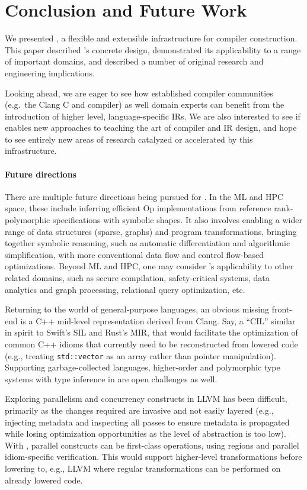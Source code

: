 \section{Conclusion and Future Work}

We presented \MLIR, a flexible and extensible infrastructure for compiler
construction. This paper described \MLIR's concrete
design, demonstrated its applicability to a range of
important domains, and described a number of original research and engineering
implications.

Looking ahead, we are eager to see how established compiler communities
(e.g.\ the Clang C and \Cpp compiler) as well domain experts can benefit from the
introduction of higher level, language-specific IRs. We are also interested to
see if \MLIR enables new approaches to teaching the art of compiler and IR
design, and hope to see entirely new areas of research catalyzed or accelerated
by this infrastructure.

\paragraph{Future directions}

There are multiple future directions being pursued for \MLIR.
In the ML and HPC space, these include inferring efficient Op implementations from reference rank-polymorphic specifications with symbolic shapes. It also involves enabling a wider range of data structures (sparse, graphs) and program transformations, bringing together symbolic reasoning, such as automatic differentiation and algorithmic simplification, with more conventional data flow and control flow-based optimizations. Beyond ML and HPC, one may consider \MLIR's applicability to other related domains, such as secure compilation, safety-critical systems, data analytics and graph processing, relational query optimization, etc.

Returning to the world of general-purpose languages, an obvious missing front-end
is a C++ mid-level
representation derived from Clang. Say, a ``CIL'' similar in spirit to Swift's SIL and Rust's MIR, that would facilitate the optimization of
common C++ idioms that currently need to be reconstructed from lowered code (e.g.,
treating \lstinline{std::vector} as an array rather than pointer manipulation). Supporting garbage-collected languages, higher-order and polymorphic type systems with type inference in \MLIR are open challenges as well.

Exploring parallelism and concurrency constructs in LLVM has been difficult,
primarily as the changes required are invasive and not easily layered (e.g.,
injecting metadata and inspecting all passes to ensure metadata is propagated
while losing optimization opportunities as the level of abstraction is too low).
With \MLIR, parallel constructs
can be first-class operations, using regions and parallel idiom-specific verification. This would support
higher-level transformations before lowering to, e.g., LLVM where regular
transformations can be performed on already lowered code.

